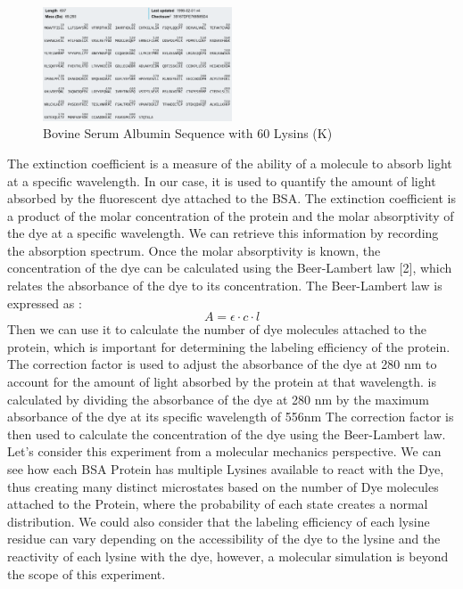 \documentclass[a4paper,english,12pt,bibliography=totoc]{scrreprt}
\begin{document}
\begin{figure}[H]
    \centering
    \includegraphics[width=0.5\textwidth]{sequence.png}
    \caption{Bovine Serum Albumin Sequence with 60 Lysins (K) }
    \label{fig:ViolinPlot}
\end{figure}

The extinction coefficient is a measure of the ability of a molecule to absorb light at a specific wavelength. In our case, it is used to quantify the amount of light absorbed by the fluorescent dye attached to the BSA. The extinction coefficient is a product of the molar concentration of the protein and the molar absorptivity of the dye at a specific wavelength.
We can retrieve this information by recording the absorption spectrum.
Once the molar absorptivity is known, the concentration of the dye can be calculated using the Beer-Lambert law [2], which relates the absorbance of the dye to its concentration. The Beer-Lambert law is expressed as :
$$A = \epsilon \cdot c \cdot l$$ 
Then we can use it to calculate the number of dye molecules attached to the protein, which is important for determining the labeling efficiency of the protein. 
The correction factor is used to adjust the absorbance of the dye at 280 nm to account for the amount of light absorbed by the protein at that wavelength. is calculated by dividing the absorbance of the dye at 280 nm by the maximum absorbance of the dye at its specific wavelength of 556nm The correction factor is then used to calculate the concentration of the dye using the Beer-Lambert law. 
Let's consider this experiment from a molecular mechanics perspective. We can see how each BSA Protein has multiple Lysines available to react with the Dye, thus creating many distinct microstates based on the number of Dye molecules attached to the Protein, where the probability of each state creates a normal distribution. We could also consider that
the labeling efficiency of each lysine residue can vary depending on the accessibility of the dye to the lysine and the reactivity of each lysine with the dye, however, a molecular simulation is beyond the scope of this experiment.
\end{document}
